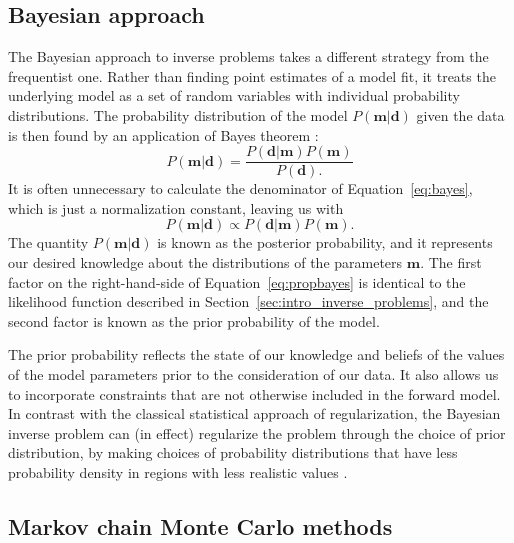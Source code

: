\documentclass[preprint,12pt,authoryear]{elsarticle}
\begin{document}
\subsection{Bayesian approach}

The Bayesian approach to inverse problems takes a different strategy from the frequentist one.
Rather than finding point estimates of a model fit, it treats the underlying model
as a set of random variables with individual probability distributions.
The probability distribution of the model $P(\mathbf{m} \vert \mathbf{d})$ given the data 
is then found by an application of Bayes theorem \citep[cf.][]{sivia2006data}:
\begin{equation}
P\left(\mathbf{m} \vert \mathbf{d} \right) = \frac{ P \left(\mathbf{d}\vert \mathbf{m} \right) P \left( \mathbf{m} \right) }{P \left( \mathbf{d}\right).}
\label{eq:bayes}
\end{equation}
It is often unnecessary to calculate the denominator of Equation~\eqref{eq:bayes}, which is
just a normalization constant, leaving us with
\begin{equation}
P\left(\mathbf{m} \vert \mathbf{d} \right) \propto P \left( \mathbf{d} \vert \mathbf{m} \right) P \left( \mathbf{m} \right).
\label{eq:propbayes}
\end{equation}
The quantity $P(\mathbf{m} \vert \mathbf{d})$ is known as the posterior probability,
and it represents our desired knowledge about the distributions of the parameters $\mathbf{m}$.
The first factor on the right-hand-side of Equation~\eqref{eq:propbayes} is identical to the likelihood
function described in Section~\ref{sec:intro_inverse_problems}, and the second factor
is known as the prior probability of the model.

The prior probability reflects the state of our knowledge and beliefs of the values
of the model parameters prior to the consideration of our data. It also allows us
to incorporate constraints that are not otherwise included in the forward model.
In contrast with the classical statistical approach of regularization, the Bayesian
inverse problem can (in effect) regularize the problem through the choice of prior distribution, by making
choices of probability distributions that have less probability density in
regions with less realistic values \citep{minson2013bayesian, sambridge2013transdimensional}.

\subsection{Markov chain Monte Carlo methods}
\end{document}
